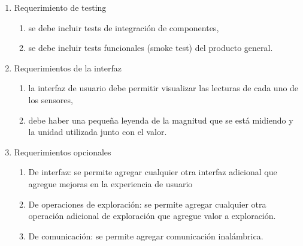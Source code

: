 \begin{enumerate}
	\item Requerimiento de testing		
		\begin{enumerate}			
			\item se debe incluir tests de integración de componentes,
			\item se debe incluir tests funcionales (smoke test) del producto general.		
		\end{enumerate}	
	\item Requerimientos de la interfaz		
		\begin{enumerate}			
			\item la interfaz de usuario debe permitir visualizar las lecturas de cada uno de los sensores,			
			\item debe haber una pequeña leyenda de la magnitud que se está midiendo y la unidad utilizada junto con el valor.		
		\end{enumerate}	
	\item Requerimientos opcionales		
		\begin{enumerate}			
			\item De interfaz: se permite agregar cualquier otra interfaz adicional que agregue mejoras en la experiencia de usuario			
			\item De operaciones de exploración: se permite agregar cualquier otra operación adicional de exploración que agregue valor a exploración.	
			\item De comunicación: se permite agregar comunicación inalámbrica.		
	\end{enumerate}
\end{enumerate}

